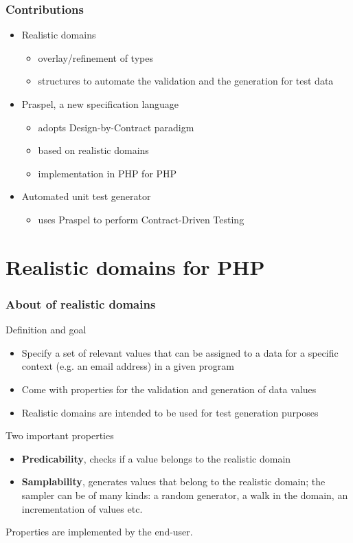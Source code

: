 \documentclass[10pt]{beamer}
\newcommand{\outline}[0]{
  \frame{\frametitle{Outline}\tableofcontents[hideallsubsections]}
}
\begin{document}
\begin{frame}
\frametitle{Contributions}

\begin{itemize}
\item Realistic domains
  \begin{itemize}
  \item overlay/refinement of types
  \item structures to automate the validation and the generation for test data
  \end{itemize}
\item Praspel, a new specification language
  \begin{itemize}
  \item adopts Design-by-Contract paradigm
  \item based on realistic domains
  \item implementation in PHP for PHP
  \end{itemize}
\item Automated unit test generator
  \begin{itemize}
  \item uses Praspel to perform Contract-Driven Testing
  \end{itemize}
\end{itemize}

\end{frame}

\outline

\section{Realistic domains for PHP}

\begin{frame}
\frametitle{About of realistic domains}

\begin{block}{Definition and goal}
\begin{itemize}
\item Specify a set of relevant values that can be assigned to a data for a
specific context (e.g. an email address) in a given program
\item Come with properties for the validation and generation of data values
\item Realistic domains are intended to be used for test generation purposes
\end{itemize}
\end{block}

\begin{block}{Two important properties}
\begin{itemize}
\item \textbf{Predicability}, checks if a value belongs to the realistic domain
\item \textbf{Samplability}, generates values that belong to the realistic
domain; the sampler can be of many kinds: a random generator, a walk in the
domain, an incrementation of values etc.
\end{itemize}
Properties are implemented by the end-user.
\end{block}

\end{frame}
\end{document}
